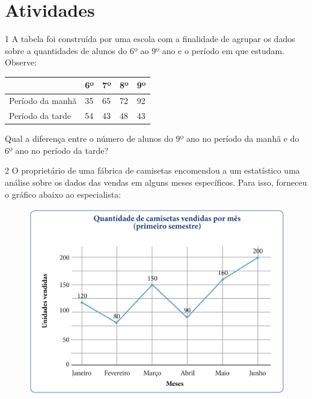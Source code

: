 \section{Atividades}

\num{1} A tabela foi construída por uma escola com a finalidade de agrupar
os dados sobre a quantidades de alunos do 6º ao 9º ano e o período
em que estudam. Observe:

\begin{longtable}[]{@{}lllll@{}}
\toprule
& 6º & 7º & 8º & 9º\tabularnewline
\midrule
\endhead
Período da manhã & 35 & 65 & 72 & 92\tabularnewline
Período da tarde & 54 & 43 & 48 & 43\tabularnewline
\bottomrule
\end{longtable}

Qual a diferença entre o número de alunos do 9º ano no período da manhã
e do 6º ano no período da tarde?


\pagebreak
\num{2} O proprietário de uma fábrica de camisetas encomendou a um
estatístico uma análise sobre os dados das vendas em alguns
meses específicos. Para isso, forneceu o gráfico abaixo ao especialista:

\begin{figure}[htpb!]
\includegraphics[width=\textwidth]{../ilustracoes/MAT5/SAEB_5ANO_MAT_figura101.png}
\end{figure}

